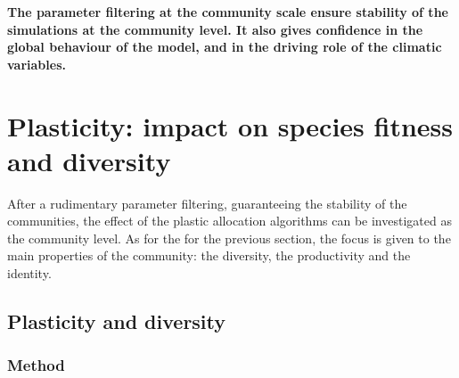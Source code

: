 \textbf{The parameter filtering at the community scale ensure stability of the simulations at the community level. It also gives confidence in the global behaviour of the model, and in the driving role of the climatic variables.}
%
%

\chapter{Plasticity: impact on species fitness and diversity}

After a rudimentary parameter filtering, guaranteeing the stability of the communities, the effect of the plastic allocation algorithms can be investigated as the community level. As for the for the previous section, the focus is given to the main properties of the community: the diversity, the productivity and the identity. 
%
%
%

\section{Plasticity and diversity}


\subsection{Method}

